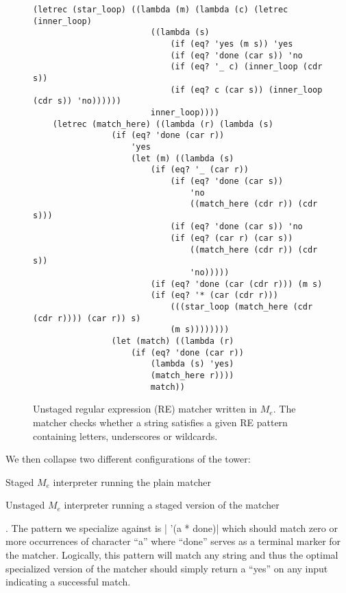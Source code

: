 \documentclass[a4paper,12pt,twoside,openright]{report}
\theoremstyle{definition}
\newcommand{\mevl}{$M_{e}$}
\begin{document}
\begin{figure}[htp!]
    \centering
    \begin{verbatim}
(letrec (star_loop) ((lambda (m) (lambda (c) (letrec (inner_loop)
                        ((lambda (s)
                            (if (eq? 'yes (m s)) 'yes
                            (if (eq? 'done (car s)) 'no
                            (if (eq? '_ c) (inner_loop (cdr s))
                            (if (eq? c (car s)) (inner_loop (cdr s)) 'no))))))
                        inner_loop))))
    (letrec (match_here) ((lambda (r) (lambda (s)
                (if (eq? 'done (car r))
                    'yes
                    (let (m) ((lambda (s)
                        (if (eq? '_ (car r))
                            (if (eq? 'done (car s))
                                'no
                                ((match_here (cdr r)) (cdr s)))
                            (if (eq? 'done (car s)) 'no
                            (if (eq? (car r) (car s))
                                ((match_here (cdr r)) (cdr s))
                                'no)))))
                        (if (eq? 'done (car (cdr r))) (m s)
                        (if (eq? '* (car (cdr r)))
                            (((star_loop (match_here (cdr (cdr r)))) (car r)) s)
                            (m s))))))))
                (let (match) ((lambda (r)
                    (if (eq? 'done (car r))
                        (lambda (s) 'yes)
                        (match_here r))))
                        match))
    \end{verbatim}
    \caption{Unstaged regular expression (RE) matcher written in \mevl. The matcher checks whether a string satisfies a given RE pattern containing letters, underscores or wildcards.}
    \label{lst:regexp}
\end{figure}

We then collapse two different configurations of the tower:
\begin{enumerate*}[label=(\arabic*)]
    \item Staged \mevl{} interpreter running the plain matcher
    \item Unstaged \mevl{} interpreter running a staged version of the matcher
\end{enumerate*}. The pattern we specialize against is
|    '(a * done)|
which should match zero or more occurrences of character ``a'' where ``done'' serves as a terminal marker for the matcher. Logically, this pattern will match any string and thus the optimal specialized version of the matcher should simply return a ``yes'' on any input indicating a successful match.
\end{document}
